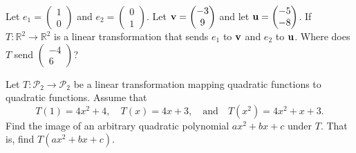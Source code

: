 \begin{problem}
    Let $e_1 = \begin{pmatrix}1\\0\end{pmatrix}$ and $e_2 =
        \begin{pmatrix}0\\1\end{pmatrix}$.  Let ${\bf v} = \begin{pmatrix}-3\\9\end{pmatrix}$ and let ${\bf u} =
            \begin{pmatrix}-5\\-8\end{pmatrix}$.
    If $T:\mathbb{R}^2 \to \mathbb{R}^2$ is a linear transformation that sends $e_1$ to
    ${\bf v}$ and $e_2$ to ${\bf u}$.  Where does $T$ send $\begin{pmatrix}-4\\6\end{pmatrix}$?
\end{problem}


\begin{problem}
    Let $T:\mathcal{P}_2 \to \mathcal{P}_2$ be a linear transformation mapping quadratic
    functions to quadratic functions.  Assume that 
    \[ T(1) = 4x^2 + 4, \quad T(x) = 4x+3, \quad \text{and} \quad T(x^2) = 4x^2 + x + 3.
        \]
    Find the image of an arbitrary quadratic polynomial $ax^2 + bx + c$ under $T$.  That
    is, find $T(ax^2 + bx + c)$.
\end{problem}
